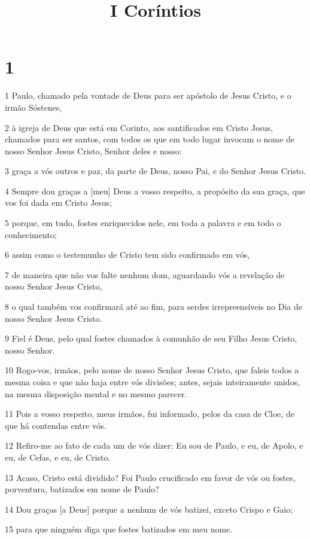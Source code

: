 

\title{I Coríntios}


\chapter{1}

\par 1 Paulo, chamado pela vontade de Deus para ser apóstolo de Jesus Cristo, e o irmão Sóstenes,
\par 2 à igreja de Deus que está em Corinto, aos santificados em Cristo Jesus, chamados para ser santos, com todos os que em todo lugar invocam o nome de nosso Senhor Jesus Cristo, Senhor deles e nosso:
\par 3 graça a vós outros e paz, da parte de Deus, nosso Pai, e do Senhor Jesus Cristo.
\par 4 Sempre dou graças a [meu] Deus a vosso respeito, a propósito da sua graça, que vos foi dada em Cristo Jesus;
\par 5 porque, em tudo, fostes enriquecidos nele, em toda a palavra e em todo o conhecimento;
\par 6 assim como o testemunho de Cristo tem sido confirmado em vós,
\par 7 de maneira que não vos falte nenhum dom, aguardando vós a revelação de nosso Senhor Jesus Cristo,
\par 8 o qual também vos confirmará até ao fim, para serdes irrepreensíveis no Dia de nosso Senhor Jesus Cristo.
\par 9 Fiel é Deus, pelo qual fostes chamados à comunhão de seu Filho Jesus Cristo, nosso Senhor.
\par 10 Rogo-vos, irmãos, pelo nome de nosso Senhor Jesus Cristo, que faleis todos a mesma coisa e que não haja entre vós divisões; antes, sejais inteiramente unidos, na mesma disposição mental e no mesmo parecer.
\par 11 Pois a vosso respeito, meus irmãos, fui informado, pelos da casa de Cloe, de que há contendas entre vós.
\par 12 Refiro-me ao fato de cada um de vós dizer: Eu sou de Paulo, e eu, de Apolo, e eu, de Cefas, e eu, de Cristo.
\par 13 Acaso, Cristo está dividido? Foi Paulo crucificado em favor de vós ou fostes, porventura, batizados em nome de Paulo?
\par 14 Dou graças [a Deus] porque a nenhum de vós batizei, exceto Crispo e Gaio;
\par 15 para que ninguém diga que fostes batizados em meu nome.
